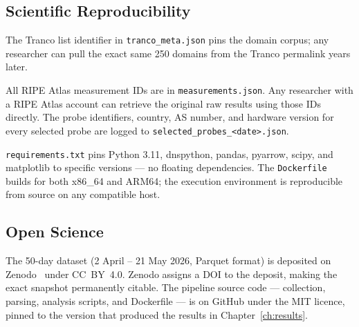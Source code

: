 \subsection{Scientific Reproducibility}
\label{subsec:3.6.2}

The Tranco list identifier in \texttt{tranco\_meta.json} pins the domain corpus; any researcher can pull the exact same 250 domains from the Tranco permalink years later.

All RIPE Atlas measurement IDs are in \texttt{measurements.json}. Any researcher with a RIPE Atlas account can retrieve the original raw results using those IDs directly. The probe identifiers, country, \ac{AS} number, and hardware version for every selected probe are logged to \texttt{selected\_probes\_<date>.json}.

\texttt{requirements.txt} pins Python 3.11, dnspython, pandas, pyarrow, scipy, and matplotlib to specific versions --- no floating dependencies. The \texttt{Dockerfile} builds for both x86\_64 and ARM64; the execution environment is reproducible from source on any compatible host.

\subsection{Open Science}
\label{subsec:3.6.3}

The 50-day dataset (2 April -- 21 May 2026, Parquet format) is deposited on Zenodo~\cite{Zenodo} under CC~BY~4.0. Zenodo assigns a \ac{DOI} to the deposit, making the exact snapshot permanently citable. The pipeline source code --- collection, parsing, analysis scripts, and Dockerfile --- is on GitHub under the MIT licence, pinned to the version that produced the results in Chapter~\ref{ch:results}.
